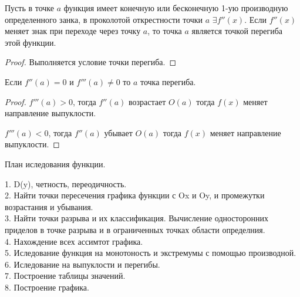 \begin{block}
  Пусть в точке $a$ функция имеет конечную или бесконечную 1-ую производную
  определенного занка, в проколотой открестности точки $a$ $\exists f''(x)$.
  Если $f''(x)$ меняет знак при переходе через точку $a$, то точка $a$ является
  точкой перегиба этой функции.
\end{block}

\begin{proof}
  Выполняется условие точки перегиба.
\end{proof}

\begin{theorem}
  Если $f''(a) = 0$ и $f'''(a) \not= 0$ то $a$ точка перегиба.
\end{theorem}

\begin{proof}
  $f'''(a) > 0$, тогда $f''(a)$ возрастает $O(a)$ тогда $f(x)$ меняет
  направление выпуклости.

  $f'''(a) < 0$, тогда $f''(a)$ убывает $O(a)$ тогда $f(x)$ меняет направление
  выпуклости.
\end{proof}

\begin{title}[\Large]
  План иследования функции.
\end{title}
1. D(y), четность, переодичность.\\
2. Найти точки пересечения графика функции с Ox и Oy, и промежутки возрастания
  и убывания.\\
3. Найти точки разрыва и их классификация. Вычисление односторонних приделов
  в точке разрыва и в ограниченных точках области определния.\\
4. Нахождение всех ассимтот графика.\\
5. Иследование функция на монотоность и экстремумы с помощью производной.\\
6. Иследование на выпуклости и перегибы.\\
7. Построение таблицы значений.\\
8. Построение графика.\\